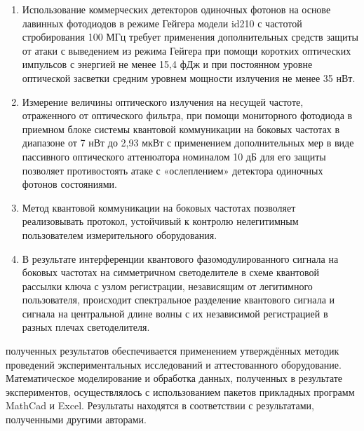 
{}
\begin{enumerate}
  \item Использование коммерческих детекторов одиночных фотонов на основе лавинных фотодиодов в режиме Гейгера модели id210 с частотой стробирования 100 МГц  требует применения дополнительных средств защиты от атаки с выведением из режима Гейгера при помощи коротких оптических импульсов с энергией не менее 15,4 фДж и при постоянном уровне оптической засветки средним уровнем мощности излучения не менее 35 нВт.  
  \item Измерение величины оптического излучения на несущей частоте, отраженного от оптического фильтра, при помощи мониторного фотодиода в приемном блоке системы квантовой коммуникации на боковых частотах в диапазоне от 7 нВт до 2,93 мкВт с применением дополнительных мер в виде пассивного оптического аттенюатора номиналом 10 дБ для его защиты позволяет противостоять атаке с «ослеплением» детектора одиночных фотонов
состояниями. 
  \item Метод квантовой коммуникации на боковых частотах позволяет реализовывать протокол, устойчивый к контролю нелегитимным пользователем измерительного оборудования. 
  \item В результате интерференции квантового фазомодулированного сигнала на боковых частотах на симметричном светоделителе в схеме квантовой рассылки ключа с узлом регистрации, независящим от легитимного пользователя, происходит спектральное разделение квантового сигнала и сигнала на центральной длине волны с их независимой регистрацией в разных плечах светоделителя. 
\end{enumerate}

{\reliability} полученных результатов обеспечивается применением утверждённых методик проведений экспериментальных исследований и аттестованного оборудование. Математическое моделирование и обработка данных, полученных в результате экспериментов, осуществлялось с использованием пакетов прикладных программ MathCad и Excel. Результаты находятся в соответствии с результатами, полученными другими авторами.


